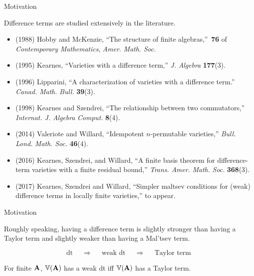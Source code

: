 \documentclass[notes=hide,12pt,xcolor=dvipsnames%
   ]{beamer}
\theoremstyle{definition}
\begin{document}
\begin{frame}[label=motivation-lit]{Motivation}

  Difference terms are studied extensively in the literature.

\begin{itemize}


\item
  {\footnotesize (1988)
    Hobby and McKenzie, ``The structure of finite algebras,''~{\bf 76} of
    {\em Contemporary Mathematics}, {\em Amer. Math. Soc.} }
\item
  {\footnotesize (1995) 
    Kearnes, ``Varieties with a difference term,'' 
    {\em J. Algebra} {\bf 177}(3).}
\item
  {\footnotesize (1996)
    Lipparini, ``A characterization of varieties with a difference term.''
    {\em Canad. Math. Bull.} {\bf 39}(3).}
\item
  {\footnotesize (1998)
    Kearnes and Szendrei, ``The relationship between two commutators,''
    {\em Internat. J. Algebra Comput.} {\bf 8}(4). } 
\item
  {\footnotesize (2014)
    Valeriote and Willard, ``Idempotent {$n$}-permutable varieties,'' 
    {\em Bull. Lond. Math. Soc.} {\bf 46}(4).}
\item
  {\footnotesize (2016)
    Kearnes, Szendrei, and Willard, ``A finite basis theorem for
    difference-term varieties with a finite residual bound,'' 
    {\em Trans. Amer. Math. Soc.} {\bf 368}(3).}
\item
  {\footnotesize (2017)
  Kearnes, Szendrei and Willard, ``Simpler maltsev conditions for (weak)
  difference terms in locally finite varieties,'' to appear.}
\end{itemize}
\end{frame}


\begin{frame}[label=motivation-heuristics]{Motivation}

  Roughly speaking, having a difference term is slightly stronger than having
  a Taylor term and slightly weaker than having a Mal'tsev term.

  \[
  \text{ dt } \quad \Rightarrow \quad \text{ weak dt } \quad \Rightarrow \quad \text{ Taylor term}\]
  
  For finite $\mathbf{A}$, $\operatorname{\mathbb{V}}(\mathbf{A})$ has a weak dt iff
  $\operatorname{\mathbb{V}}(\mathbf{A})$ has a Taylor term.
\end{frame}
\end{document}
